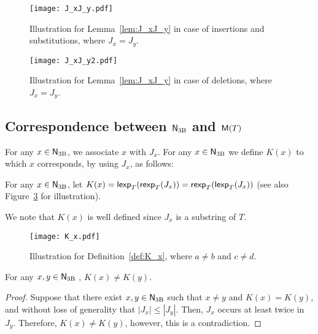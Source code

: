   \begin{figure}[H]
    \centering
    \texttt{[image: J\_xJ\_y.pdf]}
    \caption{Illustration for Lemma~\ref{lem:J_xJ_y} in case of insertions and substitutions, where $J_x = J_y$.
    }
    \label{fig:J_xJ_y}
  \end{figure}

  \begin{figure}[H]
    \centering
    \texttt{[image: J\_xJ\_y2.pdf]}
    \caption{Illustration for Lemma~\ref{lem:J_xJ_y} in case of deletions, where $J_x = J_y$.}
    \label{fig:J_xJ_y2}
  \end{figure}

  \subsection{Correspondence between $\mathsf{N}_{\mathrm{3B}}$ and $\mathsf{M}(T)$}
  For any $x \in \mathsf{N}_{\mathrm{3B}}$, we associate $x$ with $J_x$.
  For any $x \in \mathsf{N}_{\mathrm{3B}}$
  we define $K(x)$ to which $x$ corresponds, by using $J_x$,
  as follows:

  \begin{definition}\label{def:K_x}
    For any $x \in \mathsf{N}_{\mathrm{3B}}$, let $K(x)=\mathsf{lexp}_T({\mathsf{rexp}_T({J_x})}) = \mathsf{rexp}_T({\mathsf{lexp}_T({J_x})})$ (see also Figure~\ref{fig:K_x} for illustration).
  \end{definition}
  We note that $K(x)$ is well defined since $J_x$ is a substring of $T$.

  \begin{figure}[H]
    \centering
    \texttt{[image: K\_x.pdf]}
    \caption{Illustration for Definition~\ref{def:K_x}, where $a\neq b$ and $c\neq d$.}
    \label{fig:K_x}
  \end{figure}

  \begin{lemma}\label{lem:K_xK_y}
    For any $x, y \in \mathsf{N}_{\mathrm{3B}}$ , $K(x)\neq K(y)$.
  \end{lemma}

  \begin{proof}
    Suppose that there exist $x, y \in \mathsf{N}_{\mathrm{3B}}$ such that $x \neq y$ and $K(x)= K(y)$,
    and without loss of generality that $|J_x| \leq |J_y|$.
    Then, $J_x$ occurs at least twice in $J_y$.
    Therefore, $K(x) \neq K(y)$, however, this is a contradiction.
  \end{proof}


